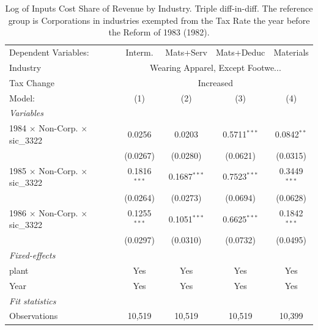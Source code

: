 \documentclass[
  12pt]{article}
\theoremstyle{definition}
\theoremstyle{remark}
\begin{document}
\begin{table}

\caption{\label{tbl-reg-didid}Log of Inputs Cost Share of Revenue by
Industry. Triple diff-in-diff. The reference group is Corporations in
industries exempted from the Tax Rate the year before the Reform of 1983
(1982).}

\begin{minipage}{\linewidth}

\begingroup
\centering
\begin{tabular}{lcccc}
   \tabularnewline \midrule \midrule
   Dependent Variables:                          & Interm.        & Mats+Serv      & Mats+Deduc     & Materials\\  
   Industry & \multicolumn{4}{c}{Wearing Apparel, Except Footwe...} \\ 
   Tax Change & \multicolumn{4}{c}{Increased} \\ 
   Model:                                        & (1)            & (2)            & (3)            & (4)\\  
   \midrule
   \emph{Variables}\\
   1984 $\times$ Non-Corp. $\times$ sic\_3322    & 0.0256         & 0.0203         & 0.5711$^{***}$ & 0.0842$^{**}$\\   
                                                 & (0.0267)       & (0.0280)       & (0.0621)       & (0.0315)\\   
   1985 $\times$ Non-Corp. $\times$ sic\_3322    & 0.1816$^{***}$ & 0.1687$^{***}$ & 0.7523$^{***}$ & 0.3449$^{***}$\\   
                                                 & (0.0264)       & (0.0273)       & (0.0694)       & (0.0628)\\   
   1986 $\times$ Non-Corp. $\times$ sic\_3322    & 0.1255$^{***}$ & 0.1051$^{***}$ & 0.6625$^{***}$ & 0.1842$^{***}$\\   
                                                 & (0.0297)       & (0.0310)       & (0.0732)       & (0.0495)\\   
   \midrule
   \emph{Fixed-effects}\\
   plant                                         & Yes            & Yes            & Yes            & Yes\\  
   Year                                          & Yes            & Yes            & Yes            & Yes\\  
   \midrule
   \emph{Fit statistics}\\
   Observations                                  & 10,519         & 10,519         & 10,519         & 10,399\\  

\end{tabular}
\end{minipage}
\end{table}
\end{document}
